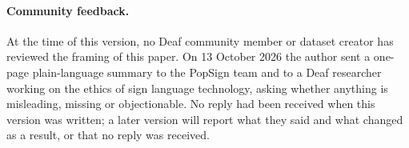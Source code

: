 \paragraph{Community feedback.} At the time of this version, no Deaf community member or dataset creator has reviewed the framing of this paper.
On 13 October 2026 the author sent a one-page plain-language summary to the PopSign team and to a Deaf researcher working on the ethics of
sign language technology, asking whether anything is misleading, missing or objectionable. No reply had been received when this
version was written; a later version will report what they said and what changed as a result, or that no reply was received.
